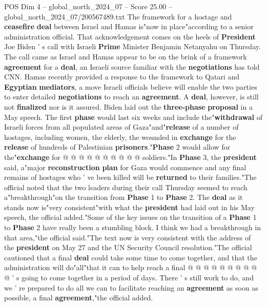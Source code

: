 \begin{textsample}{POS Dim 4 – global\_north\_2024\_07 – Score 25.00 – global\_north\_2024\_07/200567489.txt}  \label{ex:f4_pos_175}
The framework for a hostage and \textbf{ceasefire} \textbf{deal} between Israel and Hamas is"now in place"according to a senior administration official.
That acknowledgement comes on the heels of \textbf{President} Joe Biden ' s call with Israeli \textbf{Prime} Minister Benjamin Netanyahu on Thursday.
The call came as Israel and Hamas appear to be on the brink of a framework \textbf{agreement} for a \textbf{deal}, an Israeli source familiar with the \textbf{negotiations} has told CNN.
Hamas recently provided a response to the framework to Qatari and \textbf{Egyptian} \textbf{mediators}, a move Israeli officials believe will enable the two parties to enter detailed \textbf{negotiations} to reach an \textbf{agreement}.
A \textbf{deal}, however, is still not \textbf{finalized} nor is it assured.
Biden laid out the \textbf{three-phase} \textbf{proposal} in a May speech.
The first \textbf{phase} would last six weeks and include the"\textbf{withdrawal} of Israeli forces from all populated areas of Gaza"and"\textbf{release} of a number of hostages, including women, the elderly, the wounded in \textbf{exchange} for the \textbf{release} of hundreds of Palestinian \textbf{prisoners}."\textbf{Phase} 2 would allow for the"\textbf{exchange} for @ @ @ @ @ @ @ @ @ @ soldiers."In \textbf{Phase} 3, the \textbf{president} said, a"major \textbf{reconstruction} \textbf{plan} for Gaza would commence and any final remains of hostages who ' ve been killed will be \textbf{returned} to their families."The official noted that the two leaders during their call Thursday seemed to reach a"breakthrough"on the transition from \textbf{Phase} 1 to \textbf{Phase} 2.
The \textbf{deal} as it stands now is"very consistent"with what the \textbf{president} had laid out in his May speech, the official added."Some of the key issues on the transition of a \textbf{Phase} 1 to \textbf{Phase} 2 have really been a stumbling block.
I think we had a breakthrough in that area,"the official said."The text now is very consistent with the address of the \textbf{president} on May 27 and the UN Security Council resolution."The official cautioned that a final \textbf{deal} could take some time to come together, and that the administration will do"all"that it can to help reach a final @ @ @ @ @ @ @ @ @ @ ' s going to come together in a period of days.
There ' s still work to do, and we ' re prepared to do all we can to facilitate reaching an \textbf{agreement} as soon as possible, a final \textbf{agreement},"the official added.

\end{textsample}
